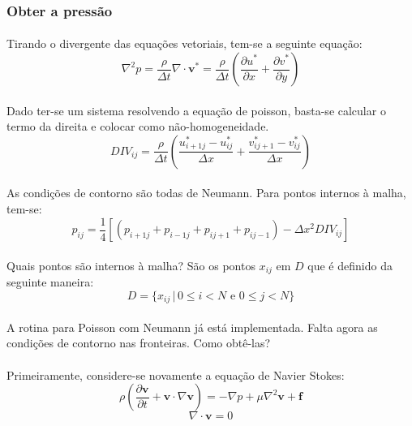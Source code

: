 \documentclass[a4paper,11pt]{article}
\begin{document}
\subsubsection{Obter a pressão}
\paragraph{} Tirando o divergente das equações vetoriais, tem-se a seguinte equação:
\begin{equation}
\nabla^2 p = \frac{\rho}{\Delta t} \nabla\cdot \textbf{v}^*=\frac{\rho}{\Delta t} 
\left( \frac{\partial u^*}{\partial x}+\frac{\partial v^*}{\partial y} \right)
\end{equation}
\paragraph{} Dado ter-se um sistema resolvendo a equação de poisson, basta-se calcular o termo da direita e colocar como não-homogeneidade.
\begin{equation}
DIV_{ij}=\frac{\rho}{\Delta t}\left( \frac{u_{i+1j}^*-u_{ij}^*}{\Delta x}+\frac{v_{ij+1}^*-v_{ij}^*}{\Delta x}\right)
\end{equation}
\paragraph{} As condições de contorno são todas de Neumann. Para pontos internos à malha, tem-se:
\begin{equation}
p_{ij}=\frac{1}{4}[(p_{i+1j}+p_{i-1j}+p_{ij+1}+p_{ij-1})-\Delta x^2 DIV_{ij}]
\end{equation}
\paragraph{} Quais pontos são internos à malha? São os pontos $x_{ij}$ em $D$ que é definido da seguinte maneira:
\begin{equation}
D = \{x_{ij}\,|\, 0\le i < N \textrm{ e } 0\le j < N \}
\end{equation}
\paragraph{} A rotina para Poisson com Neumann já está implementada. Falta agora
as condições de contorno nas fronteiras. Como obtê-las?
\paragraph{} Primeiramente, considere-se novamente a equação de Navier Stokes:
\[\rho\left( \frac{\partial \textbf{v}}{\partial t}+\textbf{v}\cdot\nabla\textbf{v}\right)=-\nabla p+\mu\nabla^2\textbf{v}+\textbf{f}\]
\[\nabla\cdot\textbf{v}=0\]
\end{document}
